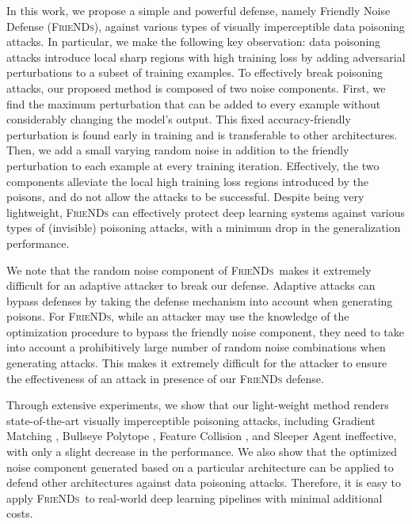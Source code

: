 \documentclass{article}
\newcommand{\alg}{\textsc{FrieNDs}}
\begin{document}
In this work, we propose a simple and powerful defense, namely {Friendly Noise Defense} (\alg), against various types of visually imperceptible data poisoning attacks.
In particular, we make the following key observation: data poisoning attacks introduce local sharp regions with high training loss by adding adversarial perturbations to a subset of training examples. 
To effectively break poisoning attacks, our proposed method is composed of two noise components. First, we find the maximum perturbation that can be added to every example without considerably changing the model's output. This fixed accuracy-friendly %
perturbation is found early in training and is transferable to other architectures. Then, we add a small varying random noise in addition to the friendly perturbation to each example at every training iteration. 
Effectively, the two components %
alleviate the local high training loss regions introduced by the poisons, 
and do not allow the attacks to be successful. %
Despite being very lightweight, %
\alg{} can effectively protect deep learning systems against various types of (invisible) poisoning attacks, with a minimum drop in the generalization performance. 

We note that the random noise component of \alg~makes it extremely difficult for an adaptive attacker to break our defense. 
Adaptive attacks can bypass defenses by taking the defense mechanism into account when generating poisons.
For \alg, while an attacker may use the knowledge of the optimization procedure to bypass the friendly noise component, they need to take into account a prohibitively large number of random noise combinations when generating attacks. This makes it extremely difficult for the attacker to ensure the effectiveness of an attack in presence of our \alg{} defense.



Through extensive experiments, we show that our light-weight method renders state-of-the-art visually imperceptible poisoning attacks, including Gradient Matching \cite{geiping2020witches}, Bullseye Polytope \citep{aghakhani2021bullseye}, Feature Collision \citep{Shafahi2018poisonfrogs}, and Sleeper Agent \citep{souri2021sleeper} ineffective, with only a slight decrease in the performance. 
We also show that the optimized noise component generated based on a particular architecture can be applied to defend other architectures against data poisoning attacks. Therefore, it is easy to apply \alg~to real-world deep learning pipelines with minimal additional costs. 
\end{document}
